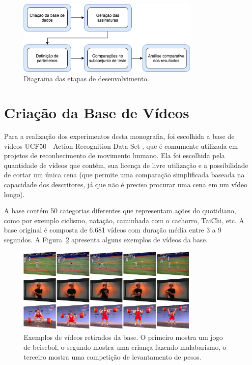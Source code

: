 \begin{figure}[h]
    \centering
    \caption{Diagrama das etapas de desenvolvimento.}
    \label{dia:metodologia}
    \includegraphics[width=0.8\textwidth]{dados/figuras/diagramas/Diag-Metodologia}
\end{figure}

\section{Criação da Base de Vídeos}
\label{sec:database}

Para a realização dos experimentos desta monografia, foi escolhida a base de vídeos UCF50 - Action Recognition Data Set \cite{reddy2013recognizing}, que é comumente utilizada em projetos de reconhecimento de movimento humano. Ela foi escolhida pela quantidade de vídeos que contém, sua licença de livre utilização e a possibilidade de cortar um única cena (que permite uma comparação simplificada baseada na capacidade dos descritores, já que não é preciso procurar uma cena em um vídeo longo).

A base contém 50 categorias diferentes que representam ações do quotidiano, como por exemplo ciclismo, natação, caminhada com o cachorro, TaiChi, etc. A base original é composta de 6.681 vídeos com duração média entre 3 a 9 segundos. A Figura~\ref{fig:exemplos} apresenta alguns exemplos de vídeos da base.

\begin{figure}
    \centering
    \caption{Exemplos de vídeos retirados da base. O primeiro mostra um jogo de beisebol, o segundo mostra uma criança fazendo malabarismo, o terceiro mostra uma competição de levantamento de pesos.}
    \label{fig:exemplos}
    \includegraphics[width=0.8\textwidth]{dados/figuras/exemplos}
\end{figure}

